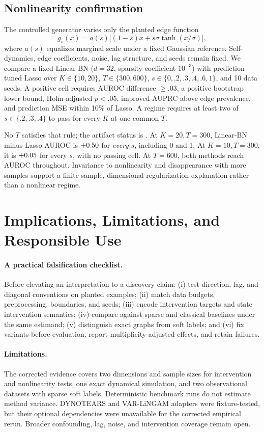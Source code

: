 \documentclass{article}
\begin{document}
\subsection{Nonlinearity confirmation}

The controlled generator varies only the planted edge function
\[
 g_s(x)=a(s)\big[(1-s)x+s\sigma\tanh(x/\sigma)\big],
\]
where $a(s)$ equalizes marginal scale under a fixed Gaussian reference.
Self-dynamics, edge coefficients, noise, lag structure, and seeds remain
fixed. We compare a fixed Linear-BN ($d=32$, sparsity coefficient $10^{-3}$)
with prediction-tuned Lasso over $K\in\{10,20\}$,
$T\in\{300,600\}$, $s\in\{0,.2,.3,.4,.6,1\}$, and 10 data seeds.
A positive cell requires AUROC difference $\geq.03$, a positive bootstrap
lower bound, Holm-adjusted $p<.05$, improved AUPRC above edge prevalence,
and prediction MSE within 10\% of Lasso. A regime requires at least two of
$s\in\{.2,.3,.4\}$ to pass for every $K$ at one common $T$.

No $T$ satisfies that rule; the artifact status is \NonlinearityStatus. At
$K=20,T=300$, Linear-BN minus Lasso AUROC is
$+0.50$ for \emph{every} $s$, including 0 and 1. At
$K=10,T=300$, it is $+0.05$ for every $s$, with no passing
cell. At $T=600$, both methods reach AUROC
\NonlinearityTSixHundredAUROC{} throughout. Invariance to
nonlinearity and disappearance with more samples support a finite-sample,
dimensional-regularization explanation rather than a nonlinear regime.

\section{Implications, Limitations, and Responsible Use}

\paragraph{A practical falsification checklist.}
Before elevating an interpretation to a discovery claim: (i) test direction,
lag, and diagonal conventions on planted examples; (ii) match data budgets,
preprocessing, boundaries, and seeds; (iii) encode intervention targets and
state intervention semantics; (iv) compare against sparse and classical
baselines under the same estimand; (v) distinguish exact graphs from soft
labels; and (vi) fix variants before evaluation, report multiplicity-adjusted
effects, and retain failures.

\paragraph{Limitations.}
The corrected evidence covers two dimensions and sample sizes for intervention
and nonlinearity tests, one exact dynamical simulation, and two observational
datasets with sparse soft labels. Deterministic benchmark runs do not estimate
method variance. DYNOTEARS and VAR-LiNGAM adapters were fixture-tested, but
their optional dependencies were unavailable for the corrected empirical
rerun. Broader confounding, lag, noise, and intervention coverage remain open.
\end{document}
